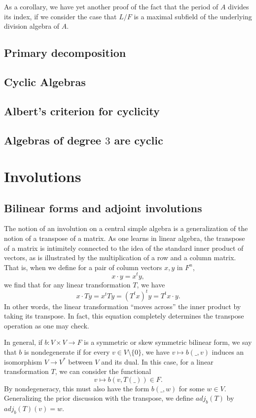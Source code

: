 \documentclass[12pt]{report}
\theoremstyle{plain}
\begin{document}
As a corollary, we have yet another proof of the fact that the period of
$A$ divides its index, if we consider the case that $L/F$ is a maximal
subfield of the underlying division algebra of $A$.

\section{Primary decomposition}

\section{Cyclic Algebras}

\section{Albert's criterion for cyclicity}

\section{Algebras of degree $3$ are cyclic}

\chapter{Involutions}

\section{Bilinear forms and adjoint involutions}

The notion of an involution on a central simple algebra is a generalization
of the notion of a transpose of a matrix. As one learns in linear algebra,
the transpose of a matrix is intimitely connected to the idea of the
standard inner product of vectors, as is illustrated by the multiplication
of a row and a column matrix. That is, when we define for a pair of column
vectors $x, y$ in $F^n$,
\[ x \cdot y = x^t y, \]
we find that for any linear transformation $T$, we have
\[ x \cdot Ty = x^t T y = (T^t x)^t y = T^t x \cdot y.\]
In other words, the linear transformation ``moves across'' the inner
product by taking its transpose. In fact, this equation completely
determines the transpose operation as one may check.

In general, if $b : V \times V \to F$ is a symmetric or skew symmetric
bilinear form, we say that $b$ is nondegenerate if for every $v \in V
\setminus \{0\}$, we have $v \mapsto b(\_, v)$ induces an isomorphism $V
\to V^*$ between $V$ and its dual. In this case, for a linear
transformation $T$, we can consider the functional
\[ v \mapsto b(v, T(\_)) \in F .\]
By nondegeneracy, this must also have the form $b(\_, w)$ for some $w \in
V$. Generalizing the prior discussion with the transpose, we define
$adj_b(T)$ by $adj_b(T)(v) = w$. 
\end{document}
